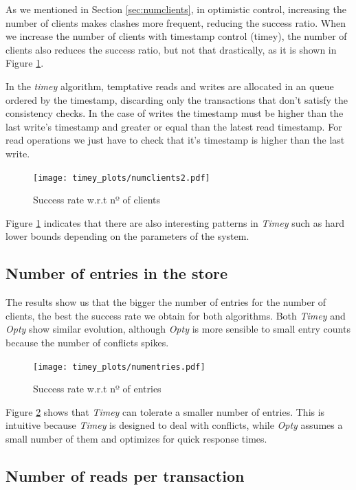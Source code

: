 \documentclass[a4paper, 10pt]{article}
\begin{document}
As we mentioned in Section \ref{sec:numclients}, in optimistic control, increasing the number of clients makes clashes more frequent, reducing the success ratio. When we increase the number of clients with timestamp control (timey), the number of clients also reduces the success ratio, but not that drastically, as it is shown in Figure \ref{timey:numclients}. 

In the \textit{timey} algorithm, temptative reads and writes are allocated in an queue ordered by the timestamp, discarding only the transactions that don't satisfy the consistency checks. In the case of writes the timestamp must be higher than the last write's timestamp and greater or equal than the latest read timestamp. For read operations we just have to check that it's timestamp is higher than the last write.

\begin{figure}[H]
  \centering
  \texttt{[image: timey\_plots/numclients2.pdf]}
    \caption{Success rate w.r.t nº of clients}
    \label{timey:numclients}
\end{figure} 

Figure \ref{timey:numclients} indicates that there are also interesting patterns in \textit{Timey} such as hard lower bounds depending on the parameters of the system.

\clearpage
\subsection{Number of entries in the store}

The results show us that the bigger the number of entries for the number of clients, the best the success rate we obtain for both algorithms. Both \textit{Timey} and \textit{Opty} show similar evolution, although \textit{Opty} is more sensible to small entry counts because the number of conflicts spikes. 

\begin{figure}[H]
  \centering
  \texttt{[image: timey\_plots/numentries.pdf]}
    \caption{Success rate w.r.t nº of entries}
    \label{timey:numentries}
\end{figure} 

Figure \ref{timey:numentries} shows that \textit{Timey} can tolerate a smaller number of entries. This is intuitive because \textit{Timey} is designed to deal with conflicts, while \textit{Opty} assumes a small number of them and optimizes for quick response times.


\clearpage
\subsection{Number of reads per transaction}
\label{timey_sec:numreads}
\end{document}
